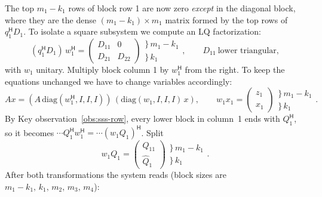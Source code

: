 \documentclass[11pt]{article}
\newcommand{\ct}{^{\mathsf H}}            %
\newcommand{\hQ}{\widehat Q}
\newcommand{\hx}{\hat x}
\theoremstyle{definition}
\begin{document}
The top $m_1-k_1$ rows of block row 1 are now zero \emph{except} in the
diagonal block, where they are the dense $(m_1-k_1)\times m_1$ matrix formed by the top rows of
$q_1\ct D_1$. To isolate a square subsystem we compute an LQ factorization:
\[
(q_1\ct D_1)\,w_1\ct =
\begin{pmatrix}
D_{11} & 0\\
D_{21} & D_{22}
\end{pmatrix}
\begin{matrix}\}\,m_1-k_1\\ \}\,k_1\phantom{-m_1}\end{matrix},
\qquad D_{11}\ \text{lower triangular},
\]
with $w_1$ unitary. Multiply block column 1 by $w_1\ct$ from the right. To keep the equations
unchanged we have to change variables accordingly:
\[
A x = (A\,\mathrm{diag}(w_1\ct,I,I,I))\,(\mathrm{diag}(w_1,I,I,I)\,x),
\qquad
w_1x_1 = \begin{pmatrix} z_1\\ \hx_1\end{pmatrix}
\begin{matrix}\}\,m_1-k_1\\ \}\,k_1\phantom{-m_1}\end{matrix}.
\]
By Key observation~\ref{obs:sss-row}, every lower block in column~1 ends with $Q_1\ct$, so it
becomes $\cdots Q_1\ct w_1\ct = \cdots (w_1Q_1)\ct$. Split
\[
w_1Q_1 = \begin{pmatrix} Q_{11}\\ \hQ_1\end{pmatrix}
\begin{matrix}\}\,m_1-k_1\\ \}\,k_1\phantom{-m_1}\end{matrix}.
\]
After both transformations the system reads (block sizes are
$m_1-k_1,\,k_1,\,m_2,\,m_3,\,m_4$):
\end{document}
